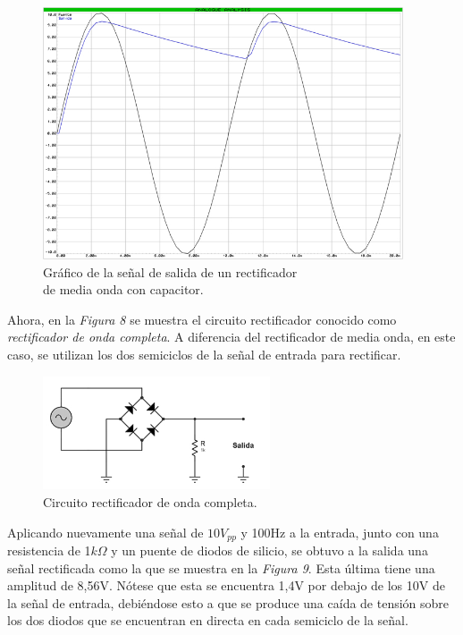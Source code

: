\documentclass{article}
\begin{document}
\begin{figure}[h]
	\centering
	\includegraphics[width=0.95\textwidth]{images/4-4-4-grafico-circuito-rectificador-media-onda-con-filtro.jpg}
	\medskip
	\caption{Gráfico de la señal de salida de un rectificador\\ de media onda con capacitor.}
\end{figure}
\bigskip\medskip


	Ahora, en la \textit{Figura 8} se muestra el circuito rectificador conocido como \textit{rectificador de onda completa}. A diferencia del rectificador de media onda, en este caso, se utilizan los dos semiciclos  de la señal de entrada para rectificar.

	

\begin{figure}[h]
	\centering
	\includegraphics[width=0.60\textwidth]{images/4-4-5-circuito-rectificador-onda-completa.jpg}
	\medskip
	\caption{Circuito rectificador de onda completa.}
\end{figure}



	Aplicando nuevamente una señal de $10V_{pp}$ y 100Hz a la entrada, junto con una resistencia de 1$k\Omega$ y un puente de diodos de silicio, se obtuvo a la salida una señal rectificada como la que se muestra en la \textit{Figura 9}. Esta última tiene una amplitud de 8,56V. Nótese que esta se encuentra 1,4V por debajo de los 10V de la señal de entrada, debiéndose esto a que se produce una caída de tensión sobre los dos diodos que se encuentran en directa en cada semiciclo de la señal. 
\bigskip\bigskip\bigskip
\end{document}
